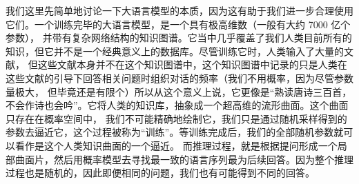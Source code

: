 \documentclass{ctexbook}
\numberwithin{theorem}{chapter}
\begin{document}



我们这里先简单地讨论一下大语言模型的本质，因为这有助于我们进一步合理使用它们。一个训练完毕的大语言模型，是一个具有极高维数（一般有大约 7000 亿个参数），
并带有复杂网络结构的知识图谱。它当中几乎覆盖了我们人类目前所有的知识，但它并不是一个经典意义上的数据库。尽管训练它时，人类输入了大量的文献，
但这些文献本身并不在这个知识图谱中，这个知识图谱中记录的只是人类在这些文献的引导下回答相关问题时组织对话的频率（我们不用概率，因为尽管参数量极大，
但毕竟还是有限个）所以从这个意义上说，它更像是“熟读唐诗三百首，不会作诗也会吟”。它将人类的知识库，抽象成一个超高维的流形曲面。这个曲面只存在在概率空间中，
我们不可能精确地绘制它，我们只是通过随机采样得到的参数去逼近它，这个过程被称为“训练”。等训练完成后，我们的全部随机参数就可以看作是这个人类知识曲面的一个逼近。
而推理过程，就是根据提问形成一个局部曲面片，然后用概率模型去寻找最一致的语言序列最为后续回答。因为整个推理过程也是随机的，因此即便相同的问题，我们也有可能得到不同的回答。
\end{document}
